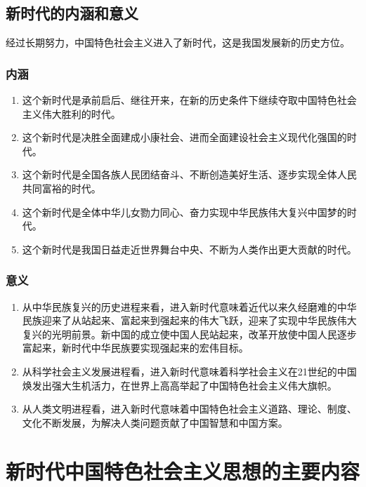     \subsection{新时代的内涵和意义}
        经过长期努力，中国特色社会主义进入了新时代，这是我国发展新的历史方位。
        \subsubsection{内涵}
        \begin{enumerate}
            \item 这个新时代是承前启后、继往开来，在新的历史条件下继续夺取中国特色社会主义伟大胜利的时代。
            \item 这个新时代是决胜全面建成小康社会、进而全面建设社会主义现代化强国的时代。
            \item 这个新时代是全国各族人民团结奋斗、不断创造美好生活、逐步实现全体人民共同富裕的时代。
            \item 这个新时代是全体中华儿女勠力同心、奋力实现中华民族伟大复兴中国梦的时代。
            \item 这个新时代是我国日益走近世界舞台中央、不断为人类作出更大贡献的时代。
        \end{enumerate}

        \subsubsection{意义}
        \begin{enumerate}
            \item 从中华民族复兴的历史进程来看，进入新时代意味着近代以来久经磨难的中华民族迎来了从站起来、富起来到强起来的伟大飞跃，迎来了实现中华民族伟大复兴的光明前景。新中国的成立使中国人民站起来，改革开放使中国人民逐步富起来，新时代中华民族要实现强起来的宏伟目标。
            \item 从科学社会主义发展进程看，进入新时代意味着科学社会主义在21世纪的中国焕发出强大生机活力，在世界上高高举起了中国特色社会主义伟大旗帜。
            \item 从人类文明进程看，进入新时代意味着中国特色社会主义道路、理论、制度、文化不断发展，为解决人类问题贡献了中国智慧和中国方案。
        \end{enumerate}


\section{新时代中国特色社会主义思想的主要内容}
